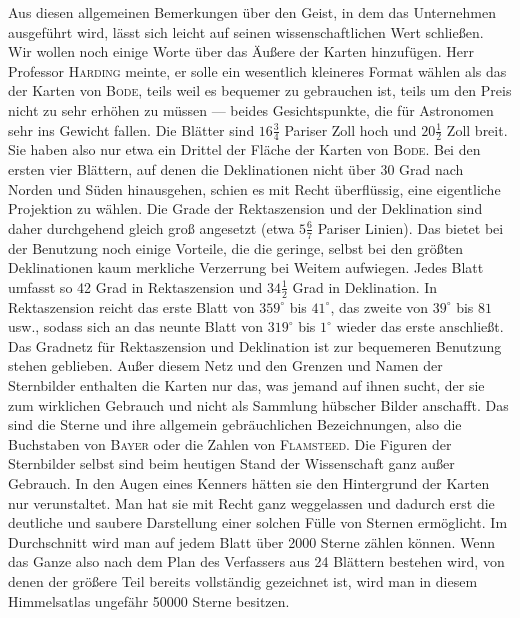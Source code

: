 Aus diesen allgemeinen Bemerkungen über den Geist, in dem das Unternehmen ausgeführt wird, lässt sich leicht auf seinen wissenschaftlichen Wert schließen. Wir wollen noch einige Worte über das Äußere der Karten hinzufügen. Herr Professor \textsc{Harding} meinte, er solle ein wesentlich kleineres Format wählen als das der Karten von \textsc{Bode}, teils weil es bequemer zu gebrauchen ist, teils um den Preis nicht zu sehr erhöhen zu müssen --- beides Gesichtspunkte, die für Astronomen sehr ins Gewicht fallen. Die Blätter sind $16\frac{3}{4}$ Pariser Zoll hoch und $20\frac{1}{2}$ Zoll breit. Sie haben also nur etwa ein Drittel der Fläche der Karten von \textsc{Bode}. Bei den ersten vier Blättern, auf denen die Deklinationen nicht über 30 Grad nach Norden und Süden hinausgehen, schien es mit Recht überflüssig, eine eigentliche Projektion zu wählen. Die Grade der Rektaszension und der Deklination sind daher durchgehend gleich groß angesetzt (etwa $5\frac{6}{7}$ Pariser Linien). Das bietet bei der Benutzung noch einige Vorteile, die die geringe, selbst bei den größten Deklinationen kaum merkliche Verzerrung bei Weitem aufwiegen. Jedes Blatt umfasst so 42 Grad in Rektaszension und $34\frac{1}{2}$ Grad in Deklination. In Rektaszension reicht das erste Blatt von $359^\circ$ bis $41^\circ$, das zweite von $39^\circ$ bis $81$ usw., sodass sich an das neunte Blatt von $319^\circ$ bis $1^\circ$ wieder das erste anschließt. Das Gradnetz für Rektaszension und Deklination ist zur bequemeren Benutzung stehen geblieben. Außer diesem Netz und den Grenzen und Namen der Sternbilder enthalten die Karten nur das, was jemand auf ihnen sucht, der sie zum wirklichen Gebrauch und nicht als Sammlung hübscher Bilder anschafft. Das sind die Sterne und ihre allgemein gebräuchlichen Bezeichnungen, also die Buchstaben von \textsc{Bayer} oder die Zahlen von \textsc{Flamsteed}. Die Figuren der Sternbilder selbst sind beim heutigen Stand der Wissenschaft ganz außer Gebrauch. In den Augen eines Kenners hätten sie den Hintergrund der Karten nur verunstaltet. Man hat sie mit Recht ganz weggelassen und dadurch erst die deutliche und saubere Darstellung einer solchen Fülle von Sternen ermöglicht. Im Durchschnitt wird man auf jedem Blatt über 2000 Sterne zählen können. Wenn das Ganze also nach dem Plan des Verfassers aus 24 Blättern bestehen wird, von denen der größere Teil bereits vollständig gezeichnet ist, wird man in diesem Himmelsatlas ungefähr 50000 Sterne besitzen.

